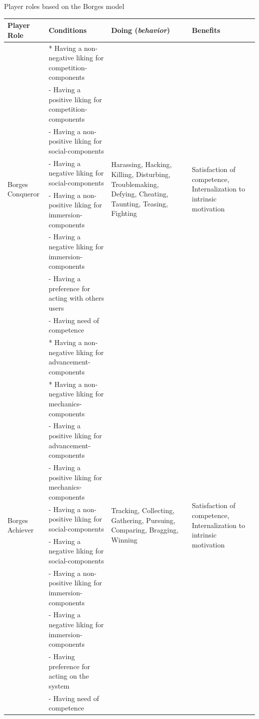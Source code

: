 \begin{quadro}[htb] \scriptsize
\caption{Player roles based on the Borges model \cite{BorgesMizoguchiDurelliBittencourtIsotani2016}}

\begin{tabular}{|p{2cm}|l|p{2.5cm}|p{2.5cm}|} \hline
Player Role & Conditions & Doing (\emph{behavior}) & Benefits \\
\hline
\multirow{8}{2cm}{Borges Conqueror} &
* Having a non-negative liking for competition-components &
\multirow{8}{2.5cm}{Harassing, Hacking, Killing, Disturbing, Troublemaking, Defying, Cheating, Taunting, Teasing, Fighting} &
\multirow{8}{2.5cm}{Satisfaction of competence, Internalization to intrinsic motivation} \\
 & - Having a positive liking for competition-components & & \\
 & - Having a non-positive liking for social-components & & \\
 & - Having a negative liking for social-components & & \\
 & - Having a non-positive liking for immersion-components & & \\
 & - Having a negative liking for immersion-components & & \\
 & - Having a preference for acting with others users & & \\
 & - Having need of competence & & \\
\hline

\multirow{10}{2cm}{Borges Achiever} &
* Having a non-negative liking for advancement-components &
\multirow{10}{2.5cm}{Tracking, Collecting, Gathering, Pursuing, Comparing, Bragging, Winning} &
\multirow{10}{2.5cm}{Satisfaction of competence, Internalization to intrinsic motivation} \\
 & * Having a non-negative liking for mechanics-components & & \\
 & - Having a positive liking for advancement-components & & \\
 & - Having a positive liking for mechanics-components & & \\
 & - Having a non-positive liking for social-components & & \\
 & - Having a negative liking for social-components & & \\
 & - Having a non-positive liking for immersion-components & & \\
 & - Having a negative liking for immersion-components & & \\
 & - Having preference for acting on the system & & \\
 & - Having need of competence & & \\
\hline


\end{tabular}
\end{quadro}
